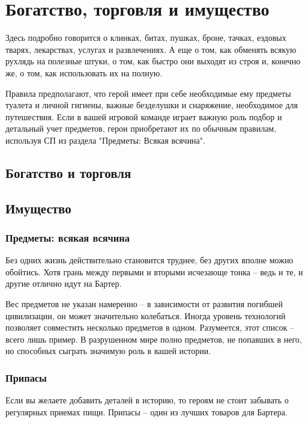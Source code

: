 \chapter{Богатство, торговля и имущество}
Здесь подробно говорится о клинках, битах, пушках, броне, тачках, ездовых тварях, лекарствах, услугах и развлечениях. А еще о том, как обменять всякую рухлядь на полезные штуки, о том, как быстро они выходят из строя и, конечно же, о том, как использовать их на полную.
\begin{tcolorbox}
    Правила предполагают, что герой имеет при себе необходимые ему предметы туалета и личной гигиены, важные безделушки и снаряжение, необходимое для путешествия. Если в вашей игровой команде играет важную роль подбор и детальный учет предметов, герои приобретают их по обычным правилам, используя СП из раздела "Предметы: Всякая всячина".
\end{tcolorbox}

\section{Богатство и торговля}

\section{Имущество}






\subsection{Предметы: всякая всячина}
Без одних жизнь действительно становится труднее, без других вполне можно обойтись. Хотя грань между первыми и вторыми исчезающе тонка – ведь и те, и другие отлично идут на Бартер.
\begin{tcolorbox}
    Вес предметов не указан намеренно – в зависимости от развития погибшей цивилизации, он может значительно колебаться. Иногда уровень технологий позволяет совместить несколько предметов в одном.
    \newline Разумеется, этот список – всего лишь пример. В разрушенном мире полно предметов, не попавших в него, но способных сыграть значимую роль в вашей истории.
\end{tcolorbox}

\subsection{Припасы}
Если вы желаете добавить деталей в историю, то героям не стоит забывать о регулярных приемах пищи. Припасы – один из лучших товаров для Бартера. 

